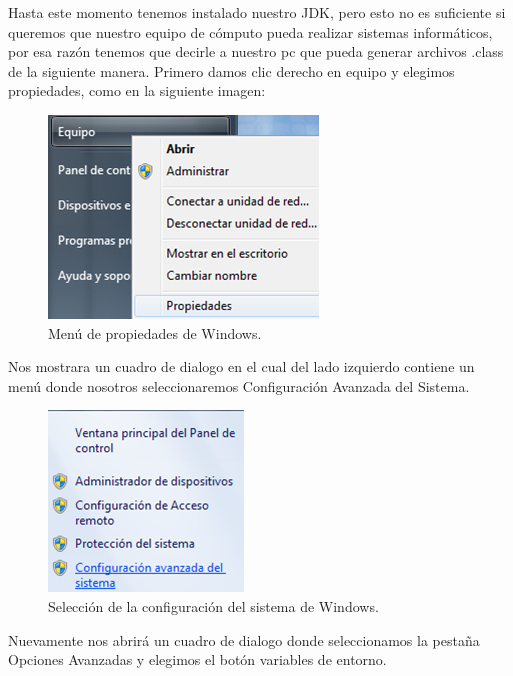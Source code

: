 Hasta este momento tenemos instalado nuestro JDK, pero esto no es
suficiente si queremos que nuestro equipo de cómputo pueda realizar sistemas
informáticos, por esa razón tenemos que decirle a nuestro pc que pueda generar
archivos .class de la siguiente manera. Primero damos clic derecho en equipo y
elegimos propiedades, como en la siguiente imagen:

\begin{figure}[H]
	\begin{center}
		\includegraphics[scale=.4]{images/instalaciones/java/img_java_9}
		\caption{Menú de propiedades de Windows.}
	\end{center}
\end{figure}

Nos mostrara
un cuadro de dialogo en el cual del lado izquierdo contiene un menú donde
nosotros seleccionaremos Configuración Avanzada del Sistema.

\begin{figure}[H]
	\begin{center}
		\includegraphics[scale=.4]{images/instalaciones/java/img_java_10}
		\caption{Selección de la configuración del sistema de Windows.}
	\end{center}
\end{figure}

Nuevamente nos abrirá un cuadro de dialogo donde seleccionamos la pestaña
Opciones Avanzadas y elegimos el botón variables de entorno.

